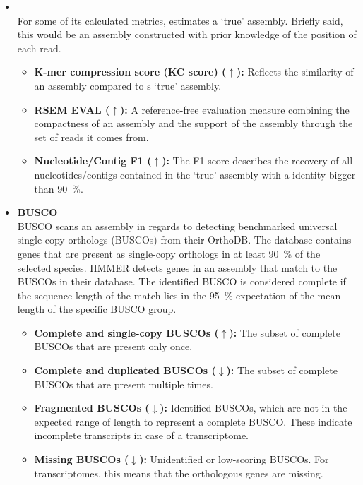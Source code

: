 \documentclass[12pt,a4paper,english]{article}
\begin{document}
\begin{itemize}
			\item \textbf{\detonate} \citep{DETONATE:14}\\
				For some of its calculated metrics, \detonate estimates a `true' assembly. Briefly said, this would be an assembly constructed with prior knowledge of the position of each read.
				\begin{itemize}
					\item \textbf{K-mer compression score (KC score) ($\uparrow$):} 
					Reflects the similarity of an assembly compared to \detonate{}s `true' assembly.					
					\item \textbf{RSEM EVAL ($\uparrow$):} A reference-free evaluation measure combining the compactness of an assembly and the support of the assembly through the set of reads it comes from.
					\item \textbf{Nucleotide/Contig F1 ($\uparrow$):} The F1 score describes the recovery of all nucleotides/contigs contained in the `true' assembly with a identity bigger than 90~\%.
				\end{itemize}

			\item \textbf{BUSCO} \citep{busco:15, busco:18}\\
			BUSCO scans an assembly in regards to detecting benchmarked universal single-copy orthologs (BUSCOs) from their OrthoDB. The database contains genes that are present as single-copy orthologs in at least 90~\% of the selected species.
			HMMER \citep{hmmer:11} detects genes in an assembly that match to the BUSCOs in their database. The identified BUSCO is considered complete if the sequence length of the match lies in the 95~\% expectation of the mean length of the specific BUSCO group.
				\begin{itemize}
					\item \textbf{Complete and single-copy BUSCOs ($\uparrow$):}
						The subset of complete BUSCOs that are present only once.
					\item \textbf{Complete and duplicated BUSCOs ($\downarrow$):}
						The subset of complete BUSCOs that are present multiple times.
					\item \textbf{Fragmented BUSCOs ($\downarrow$):}
						Identified BUSCOs, which are not in the expected range of length to represent a complete BUSCO. These indicate incomplete transcripts in case of a transcriptome.
					\item \textbf{Missing BUSCOs ($\downarrow$):}
						Unidentified or low-scoring BUSCOs.	For transcriptomes, this means that the orthologous genes are missing.
				\end{itemize}


\end{itemize}
\end{document}
